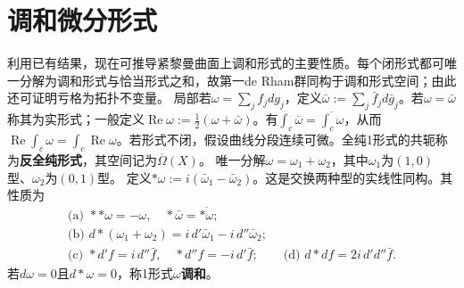 \section{调和微分形式}
利用已有结果，现在可推导紧黎曼曲面上调和形式的主要性质。每个闭形式都可唯一分解为调和形式与恰当形式之和，故第一de Rham群同构于调和形式空间；由此还可证明亏格为拓扑不变量。
局部若$\omega=\sum_jf_jdg_j$，定义$\bar\omega:=\sum_j\bar f_jd\bar g_j$。若$\omega=\bar\omega$称其为实形式；一般定义$\operatorname{Re}\omega:=\tfrac12(\omega+\bar\omega)$。有$\int_c\bar\omega=\overline{\int_c\omega}$，从而$\operatorname{Re}\int_c\omega=\int_c\operatorname{Re}\omega$。若形式不闭，假设曲线分段连续可微。全纯1形式的共轭称为\textbf{反全纯形式}，其空间记为$\overline\Omega(X)$。
唯一分解$\omega=\omega_1+\omega_2$，其中$\omega_1$为$(1,0)$型、$\omega_2$为$(0,1)$型。
定义$*\omega:=i(\bar\omega_1-\bar\omega_2)$。这是交换两种型的实线性同构。其性质为
\begin{gather*}
\text{(a) }**\omega=-\omega,\quad *\bar\omega=\overline{*\omega};\\
\text{(b) }d*(\omega_1+\omega_2)=i\,d'\bar\omega_1-i\,d''\bar\omega_2;\\
\text{(c) }*d'f=i\,d''\bar f,\quad*d''f=-i\,d'\bar f;\qquad
\text{(d) }d*df=2i\,d'd''\bar f.
\end{gather*}
若$d\omega=0$且$d*\omega=0$，称1形式$\omega$\textbf{调和}。

